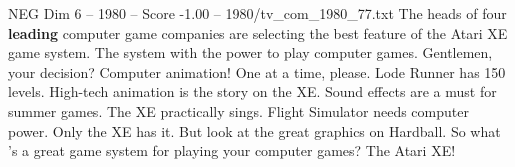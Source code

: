\begin{textsample}{NEG Dim 6 – 1980 – Score -1.00 – 1980/tv\_com\_1980\_77.txt}  \label{ex:f6_neg_035}
The heads of four \textbf{leading} computer game companies are selecting the best feature of the Atari XE game system.
The system with the power to play computer games.
Gentlemen, your decision?
Computer animation!
One at a time, please.
Lode Runner has 150 levels.
High-tech animation is the story on the XE.
Sound effects are a must for summer games.
The XE practically sings.
Flight Simulator needs computer power.
Only the XE has it.
But look at the great graphics on Hardball.
So what 's a great game system for playing your computer games?
The Atari XE!

\end{textsample}
